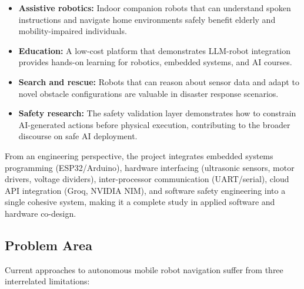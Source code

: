 \begin{itemize}[nosep]
  \item \textbf{Assistive robotics:} Indoor companion robots that can understand spoken instructions and navigate home environments safely benefit elderly and mobility-impaired individuals.
  \item \textbf{Education:} A low-cost platform that demonstrates LLM-robot integration provides hands-on learning for robotics, embedded systems, and AI courses.
  \item \textbf{Search and rescue:} Robots that can reason about sensor data and adapt to novel obstacle configurations are valuable in disaster response scenarios.
  \item \textbf{Safety research:} The safety validation layer demonstrates how to constrain AI-generated actions before physical execution, contributing to the broader discourse on safe AI deployment.
\end{itemize}

From an engineering perspective, the project integrates embedded systems programming (ESP32/Arduino), hardware interfacing (ultrasonic sensors, motor drivers, voltage dividers), inter-processor communication (UART/serial), cloud API integration (Groq, NVIDIA NIM), and software safety engineering into a single cohesive system, making it a complete study in applied software and hardware co-design.

\subsection{Problem Area}
\label{subsec:problem_area}

Current approaches to autonomous mobile robot navigation suffer from three interrelated limitations:

